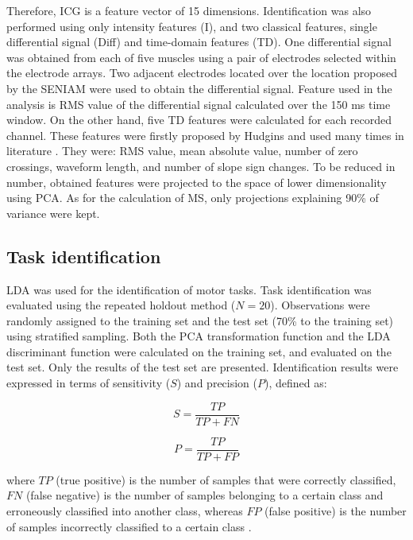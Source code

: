Therefore, ICG is a feature vector of 15 dimensions. Identification was also performed using only intensity features (I), and two classical features, single differential signal (Diff) and time-domain features (TD). One differential signal was obtained from each of five muscles using a pair of electrodes selected within the electrode arrays. Two adjacent electrodes located over the location proposed by the SENIAM were used to obtain the differential signal. Feature used in the analysis is RMS value of the differential signal calculated over the 150 ms time window. On the other hand, five TD features were calculated for each recorded channel. These features were firstly proposed by Hudgins \citep{Parker2006} and used many times in literature \citep{Hakonen2015}. They were: RMS value, mean absolute value, number of zero crossings, waveform length, and number of slope sign changes. To be reduced in number, obtained features were projected to the space of lower dimensionality using PCA. As for the calculation of MS, only projections explaining 90\% of variance were kept.


\subsection{Task identification}
LDA was used for the identification of motor tasks. Task identification was evaluated using the repeated holdout method ($N = 20$). Observations were randomly assigned to the training set and the test set (70\% to the training set) using stratified sampling. Both the PCA transformation function and the LDA discriminant function were calculated on the training set, and evaluated on the test set. Only the results of the test set are presented. Identification results were expressed in terms of sensitivity ($S$) and precision ($P$), defined as:

\begin{equation} \label{eq:3-5}
S = \frac{TP}{TP + FN}
\end{equation}

\begin{equation} \label{eq:3-6}
P = \frac{TP}{TP + FP}
\end{equation}

where $TP$ (true positive) is the number of samples that were correctly classified, $FN$ (false negative) is the number of samples belonging to a certain class and erroneously classified into another class, whereas $FP$ (false positive) is the number of samples incorrectly classified to a certain class \citep{Sokolova2009}.

